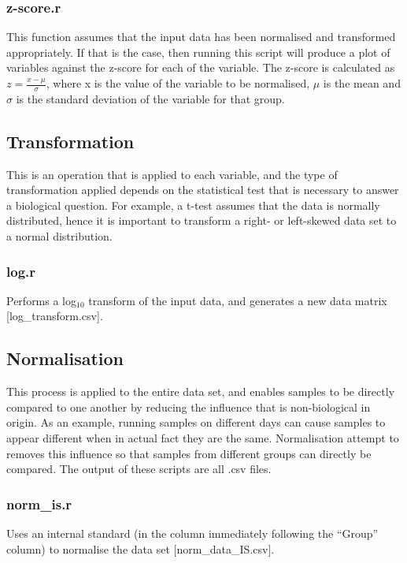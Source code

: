 \documentclass[english,a4paper,12pt]{article}
\begin{document}
\subsubsection*{z-score.r}
This function assumes that the input data has been normalised and transformed appropriately. If that is the case, then running this script will produce a plot of variables against the z-score for each of the variable. The z-score is calculated as $z=\frac{x-\mu}{\sigma}$, where x is the value of the variable to be normalised, $\mu$ is the mean and $\sigma$ is the standard deviation of the variable for that group.

\subsection*{Transformation}
This is an operation that is applied to each variable, and the type of transformation applied depends on the statistical test that is necessary to answer a biological question. For example, a t-test assumes that the data is normally distributed, hence it is important to transform a right- or left-skewed data set to a normal distribution.

\subsubsection*{log.r}
Performs a log$_{10}$ transform of the input data, and generates a new data matrix [\textsf{log\_transform.csv}].

\subsection*{Normalisation}
This process is applied to the entire data set, and enables samples to be directly compared to one another by reducing the influence that is non-biological in origin. As an example, running samples on different days can cause samples to appear different when in actual fact they are the same. Normalisation attempt to removes this influence so that samples from different groups can directly be compared. The output of these scripts are all .csv files.

\subsubsection*{norm\_is.r}
Uses an internal standard (in the column immediately following the ``Group'' column) to normalise the data set [\textsf{norm\_data\_IS.csv}].
\end{document}
